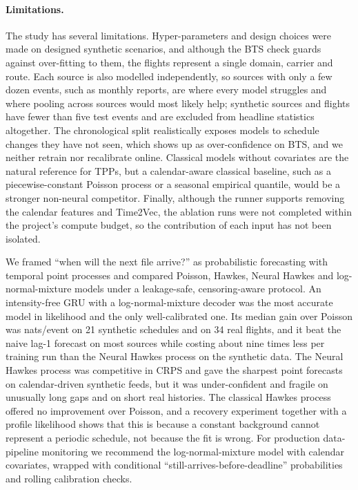 \documentclass[10pt,twocolumn]{article}
\makeatletter
\renewcommand\section{\@startsection{section}{1}{\z@}{-2.2ex plus -0.5ex minus -0.2ex}{1.0ex plus 0.2ex}{\normalfont\Large\bfseries}}
\makeatother
\begin{document}
\paragraph{Limitations.} The study has several limitations. Hyper-parameters and design choices were
made on designed synthetic scenarios, and although the BTS check guards against over-fitting to
them, the flights represent a single domain, carrier and route. Each source is also modelled
independently, so sources with only a few dozen events, such as monthly reports, are where every
model struggles and where pooling across sources would most likely help; \SynNLowN{} synthetic
sources and \BtsNLowN{} flights have fewer than five test events and are excluded from headline
statistics altogether. The chronological split realistically exposes models to schedule changes they
have not seen, which shows up as over-confidence on BTS, and we neither retrain nor recalibrate
online. Classical models without covariates are the natural reference for TPPs, but a calendar-aware
classical baseline, such as a piecewise-constant Poisson process or a seasonal empirical quantile,
would be a stronger non-neural competitor. Finally, although the runner supports removing the
calendar features and Time2Vec, the ablation runs were not completed within the project's compute
budget, so the contribution of each input has not been isolated.

\section{Conclusion}\label{sec:conclusion}
We framed ``when will the next file arrive?'' as probabilistic forecasting with temporal point
processes and compared Poisson, Hawkes, Neural Hawkes and log-normal-mixture models under a
leakage-safe, censoring-aware protocol. An intensity-free GRU with a log-normal-mixture decoder was
the most accurate model in likelihood and the only well-calibrated one. Its median gain over Poisson
was \SynLogNormMixGain{} nats/event on 21 synthetic schedules and \BtsLogNormMixGain{} on 34 real
flights, and it beat the naive lag-1 forecast on most sources while costing about nine times less
per training run than the Neural Hawkes process on the synthetic data. The Neural Hawkes process was
competitive in CRPS and gave the sharpest point forecasts on calendar-driven synthetic feeds, but it
was under-confident and fragile on unusually long gaps and on short real histories. The classical
Hawkes process offered no improvement over Poisson, and a recovery experiment together with a
profile likelihood shows that this is because a constant background cannot represent a periodic
schedule, not because the fit is wrong. For production data-pipeline monitoring we recommend the log-normal-mixture model with calendar covariates, wrapped with conditional
``still-arrives-before-deadline'' probabilities and rolling calibration checks.
\end{document}
